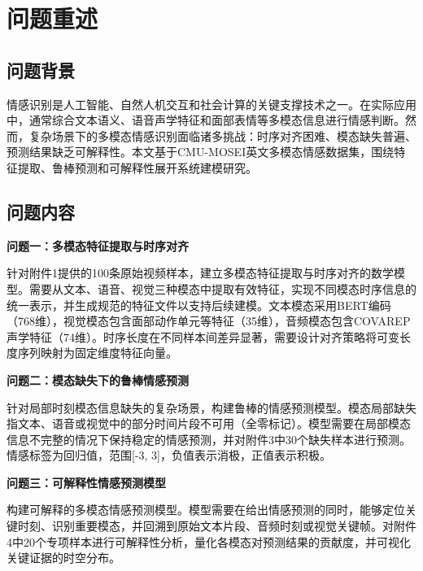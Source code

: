 \section{问题重述}


\subsection{问题背景}
情感识别是人工智能、自然人机交互和社会计算的关键支撑技术之一。在实际应用中，通常综合文本语义、语音声学特征和面部表情等多模态信息进行情感判断。然而，复杂场景下的多模态情感识别面临诸多挑战：时序对齐困难、模态缺失普遍、预测结果缺乏可解释性。本文基于CMU-MOSEI英文多模态情感数据集，围绕特征提取、鲁棒预测和可解释性展开系统建模研究。

\subsection{问题内容}
\textbf{问题一：多模态特征提取与时序对齐}

针对附件1提供的100条原始视频样本，建立多模态特征提取与时序对齐的数学模型。需要从文本、语音、视觉三种模态中提取有效特征，实现不同模态时序信息的统一表示，并生成规范的特征文件以支持后续建模。文本模态采用BERT编码（768维），视觉模态包含面部动作单元等特征（35维），音频模态包含COVAREP声学特征（74维）。时序长度在不同样本间差异显著，需要设计对齐策略将可变长度序列映射为固定维度特征向量。

\textbf{问题二：模态缺失下的鲁棒情感预测}

针对局部时刻模态信息缺失的复杂场景，构建鲁棒的情感预测模型。模态局部缺失指文本、语音或视觉中的部分时间片段不可用（全零标记）。模型需要在局部模态信息不完整的情况下保持稳定的情感预测，并对附件3中30个缺失样本进行预测。情感标签为回归值，范围[-3, 3]，负值表示消极，正值表示积极。

\textbf{问题三：可解释性情感预测模型}

构建可解释的多模态情感预测模型。模型需要在给出情感预测的同时，能够定位关键时刻、识别重要模态，并回溯到原始文本片段、音频时刻或视觉关键帧。对附件4中20个专项样本进行可解释性分析，量化各模态对预测结果的贡献度，并可视化关键证据的时空分布。


